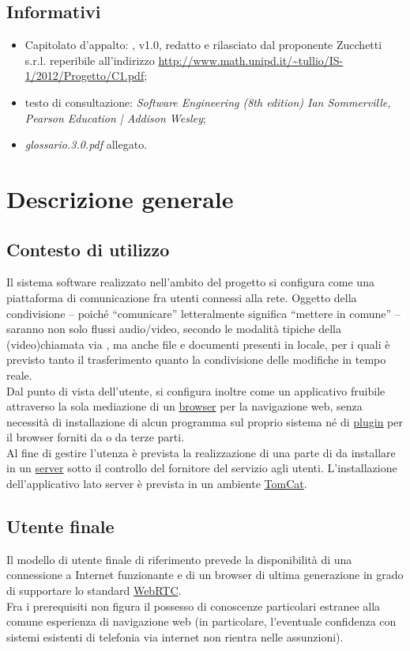 \subsection{Informativi}
\begin{itemize}
\item[] Capitolato d'appalto: \caName{}, v1.0, redatto e rilasciato dal proponente Zucchetti s.r.l. reperibile all'indirizzo \url{http://www.math.unipd.it/~tullio/IS-1/2012/Progetto/C1.pdf};
\item[] testo di consultazione: \textit{Software Engineering (8th edition) Ian Sommerville, Pearson Education | Addison Wesley};
\item[] \textit{glossario.3.0.pdf} allegato.
\end{itemize}

\clearpage
\section{Descrizione generale}

\subsection{Contesto di utilizzo}
Il sistema software realizzato nell'ambito del progetto \caName{} si configura come una piattaforma di comunicazione fra utenti connessi alla rete. Oggetto della condivisione -- poiché ``comunicare'' letteralmente significa ``mettere in comune'' -- saranno non solo flussi audio/video, secondo le modalità tipiche della (video)chiamata via , ma anche file e documenti presenti in locale, per i quali è previsto tanto il trasferimento quanto la condivisione delle modifiche in tempo reale.\\
Dal punto di vista dell'utente, \caName{} si configura inoltre come un applicativo fruibile attraverso la sola mediazione di un \underline{browser} per la navigazione web, senza necessità di installazione di alcun programma  sul proprio sistema né di \underline{plugin} per il browser forniti da \team{} o da terze parti.\\
Al fine di gestire l'utenza è prevista la realizzazione di una parte di  da installare in un \underline{server} sotto il controllo del fornitore del servizio agli utenti. L'installazione dell'applicativo lato {server} è prevista in un ambiente \underline{TomCat}.

\subsection{Utente finale}
Il modello di utente finale di riferimento prevede la disponibilità di una connessione a Internet funzionante e di un browser di ultima generazione in grado di supportare lo standard \underline{WebRTC}.\\
Fra i prerequisiti non figura il possesso di conoscenze particolari estranee alla comune esperienza di navigazione web (in particolare, l'eventuale confidenza con sistemi esistenti di telefonia via internet non rientra nelle assunzioni).

